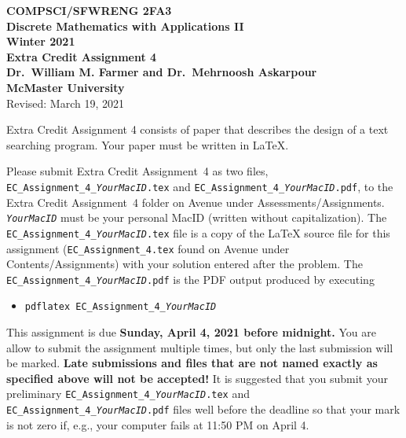 \documentclass[11pt,fleqn]{article}
\newcommand{\bsp}{\begin{sloppypar}}
\newcommand{\esp}{\end{sloppypar}}
\begin{document}
\begin{center}

  {\large \textbf{COMPSCI/SFWRENG 2FA3}}\\[2mm]
  {\large \textbf{Discrete Mathematics with Applications II}}\\[2mm]
  {\large \textbf{Winter 2021}}\\[8mm]
  {\huge \textbf{Extra Credit Assignment 4}}\\[6mm]
  {\large \textbf{Dr.~William M. Farmer and Dr.~Mehrnoosh Askarpour}}\\[2mm]
  {\large \textbf{McMaster University}}\\[6mm]
  {\large Revised: March 19, 2021}

\end{center}

\medskip

Extra Credit Assignment 4 consists of paper that describes the design
of a text searching program.  Your paper must be written in LaTeX.

\bsp
Please submit Extra Credit Assignment~4 as two files,
\texttt{EC\_Assignment\_4\_\emph{YourMacID}.tex} and
\texttt{EC\_Assignment\_4\_\emph{YourMacID}.pdf}, to the Extra Credit
Assignment~4 folder on Avenue under Assessments/Assignments.
\texttt{\emph{YourMacID}} must be your personal MacID (written without
capitalization).  The \texttt{EC\_Assignment\_4\_\emph{YourMacID}.tex}
file is a copy of the LaTeX source file for this assignment
(\texttt{EC\_Assignment\_4.tex} found on Avenue under
Contents/Assignments) with your solution entered after the problem.
The \texttt{EC\_Assignment\_4\_\emph{YourMacID}.pdf} is the PDF output
produced by executing
\esp

\begin{itemize}

  \item[] \texttt{pdflatex EC\_Assignment\_4\_\emph{YourMacID}}

\end{itemize}

This assignment is due \textbf{Sunday, April 4, 2021 before
  midnight.}  You are allow to submit the assignment multiple times,
but only the last submission will be marked.  \textbf{Late submissions
  and files that are not named exactly as specified above will not be
  accepted!}  It is suggested that you submit your preliminary
\texttt{EC\_Assignment\_4\_\emph{YourMacID}.tex} and
\texttt{EC\_Assignment\_4\_\emph{YourMacID}.pdf} files well before the
deadline so that your mark is not zero if, e.g., your computer fails
at 11:50 PM on April 4.
\end{document}
